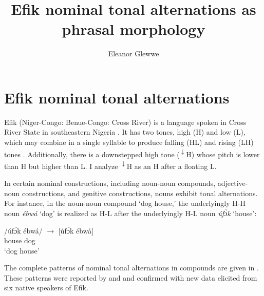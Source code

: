 \documentclass[output=paper]{langscibook}
\author{Eleanor Glewwe\affiliation{University of California, Los Angeles}}
\title{Efik nominal tonal alternations as phrasal morphology}
\begin{document}
\section{Efik nominal tonal alternations}\label{sec:glewwe:1}

Efik (Niger-Congo: Benue-Congo: Cross River) is a language spoken in Cross River State in southeastern Nigeria \citep{Cook1985}. It has two tones, high (H) and low (L), which may combine in a single syllable to produce falling (HL) and rising (LH) tones \citep{Welmers1968}. Additionally, there is a downstepped high tone (\textsuperscript{$\downarrow$}H) whose pitch is lower than H but higher than L. I analyze \textsuperscript{$\downarrow$}H as an H after a floating L. 

In certain nominal constructions, including noun-noun compounds, adjective-noun constructions, and genitive constructions, nouns exhibit tonal alternations. For instance, in the noun-noun compound ‘dog house,’ the underlyingly H-H noun \textit{ébwá} ‘dog’ is realized as H-L after the underlyingly H-L noun \textit{úfɔ̀k} ‘house’: 

\ea \label{ex:glewwe:1}
\gll /úfɔ̀k  ébwá/ {${\rightarrow}$  [úfɔ̀k ébwà]}\\ 
     house dog {}\\
\glt ‘dog house’
\z

The complete patterns of nominal tonal alternations in compounds are given in . These patterns were reported by \citet{Welmers1968} and \citet{Cook1985} and confirmed with new data elicited from six native speakers of Efik. 
\end{document}
